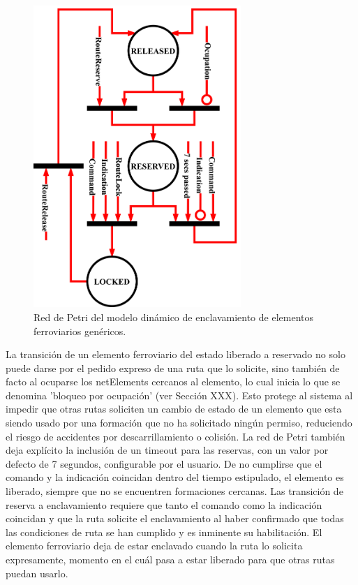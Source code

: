 \begin{figure}[H]
	\centering
	\includegraphics[width=0.7\textwidth]{Figuras/INT_petri}
	\centering\caption{Red de Petri del modelo dinámico de enclavamiento de elementos ferroviarios genéricos.}
	\label{fig:Interlocking_petri}
\end{figure}

La transición de un elemento ferroviario del estado liberado a reservado no solo puede darse por el pedido expreso de una ruta que lo solicite, sino también de facto al ocuparse los netElements cercanos al elemento, lo cual inicia lo que se denomina 'bloqueo por ocupación' (ver Sección XXX). Esto protege al sistema al impedir que otras rutas soliciten un cambio de estado de un elemento que esta siendo usado por una formación que no ha solicitado ningún permiso, reduciendo el riesgo de accidentes por descarrillamiento o colisión. La red de Petri también deja explícito la inclusión de un timeout para las reservas, con un valor por defecto de 7 segundos, configurable por el usuario. De no cumplirse que el comando y la indicación coincidan dentro del tiempo estipulado, el elemento es liberado, siempre que no se encuentren formaciones cercanas. Las transición de reserva a enclavamiento requiere que tanto el comando como la indicación coincidan y que la ruta solicite el enclavamiento al haber confirmado que todas las condiciones de ruta se han cumplido y es inminente su habilitación. El elemento ferroviario deja de estar enclavado cuando la ruta lo solicita expresamente, momento en el cuál pasa a estar liberado para que otras rutas puedan usarlo.

